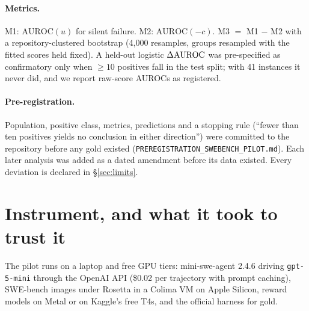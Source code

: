 \documentclass[11pt]{article}
\begin{document}
\paragraph{Metrics.} M1: $\mathrm{AUROC}(u)$ for silent failure. M2: $\mathrm{AUROC}(-c)$. M3 $= $ M1 $-$ M2 with a repository-clustered bootstrap (4{,}000 resamples, groups resampled with the fitted scores held fixed). A held-out logistic $\Delta\mathrm{AUROC}$ was pre-specified as confirmatory only when $\geq 10$ positives fall in the test split; with 41 instances it never did, and we report raw-score AUROCs as registered.

\paragraph{Pre-registration.} Population, positive class, metrics, predictions and a stopping rule (``fewer than ten positives yields no conclusion in either direction'') were committed to the repository before any gold existed (\texttt{PREREGISTRATION\_SWEBENCH\_PILOT.md}). Each later analysis was added as a dated amendment before its data existed. Every deviation is declared in \S\ref{sec:limits}.

\section{Instrument, and what it took to trust it}\label{sec:instrument}
The pilot runs on a laptop and free GPU tiers: mini-swe-agent 2.4.6 driving \texttt{gpt-5-mini} through the OpenAI API (\$0.02 per trajectory with prompt caching), SWE-bench images under Rosetta in a Colima VM on Apple Silicon, reward models on Metal or on Kaggle's free T4s, and the official harness for gold.
\end{document}
